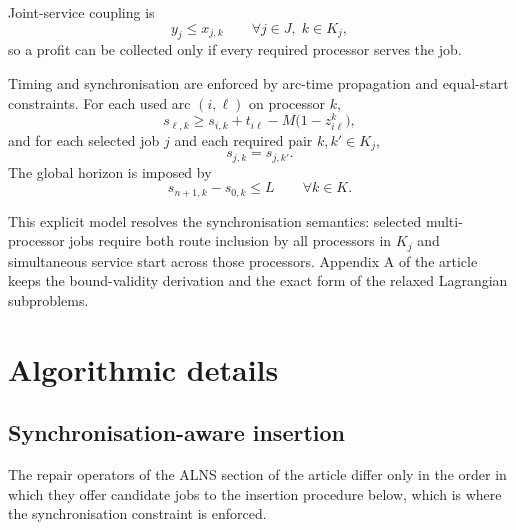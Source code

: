 \documentclass[11pt]{article}
\begin{document}
Joint-service coupling is
\[
y_j \le x_{j,k} \qquad \forall j\in J,\; k\in K_j,
\]
so a profit can be collected only if every required processor serves the job.

Timing and synchronisation are enforced by arc-time propagation and equal-start constraints. For each used arc $(i,\ell)$ on processor $k$,
\[
s_{\ell,k} \ge s_{i,k} + t_{i\ell} - M\bigl(1-z_{i\ell}^k\bigr),
\]
and for each selected job $j$ and each required pair $k,k'\in K_j$,
\[
s_{j,k}=s_{j,k'}.
\]
The global horizon is imposed by
\[
s_{n+1,k}-s_{0,k} \le L \qquad \forall k\in K.
\]

This explicit model resolves the synchronisation semantics: selected multi-processor jobs require both route inclusion by all processors in $K_j$ and simultaneous service start across those processors. Appendix A of the article keeps the bound-validity derivation and the exact form of the relaxed Lagrangian subproblems.

\section{Algorithmic details}

\subsection{Synchronisation-aware insertion}

The repair operators of the ALNS section of the article differ only in the order in which they offer candidate jobs to the insertion procedure below, which is where the synchronisation constraint is enforced.
\end{document}
